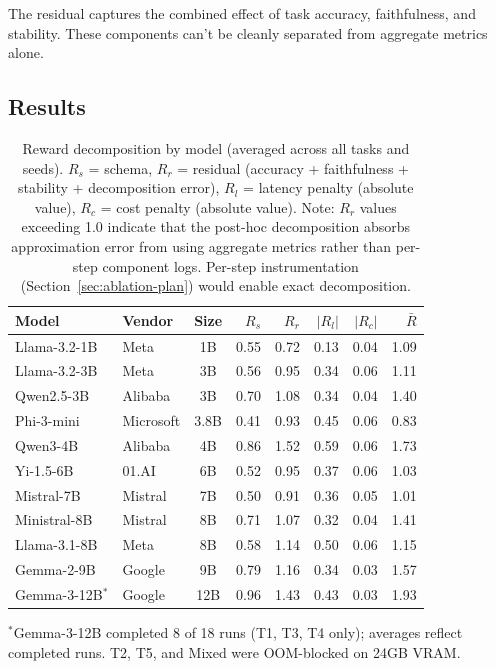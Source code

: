 \documentclass[11pt]{article}
\begin{document}
The residual captures the combined effect of task accuracy, faithfulness, and stability.  These components can't be cleanly separated from aggregate metrics alone.

\subsection{Results}

\begin{table}[t]
\centering
\caption{Reward decomposition by model (averaged across all tasks and seeds). $R_s$ = schema, $R_r$ = residual (accuracy + faithfulness + stability + decomposition error), $R_l$ = latency penalty (absolute value), $R_c$ = cost penalty (absolute value).  Note: $R_r$ values exceeding 1.0 indicate that the post-hoc decomposition absorbs approximation error from using aggregate metrics rather than per-step component logs.  Per-step instrumentation (Section~\ref{sec:ablation-plan}) would enable exact decomposition.}
\label{tab:reward-decomp}
\small
\begin{tabular}{llc rrrr r}
\toprule
\textbf{Model} & \textbf{Vendor} & \textbf{Size} & $R_s$ & $R_r$ & $|R_l|$ & $|R_c|$ & $\bar{R}$ \\
\midrule
Llama-3.2-1B    & Meta      & 1B   & 0.55 & 0.72 & 0.13 & 0.04 & 1.09 \\
Llama-3.2-3B    & Meta      & 3B   & 0.56 & 0.95 & 0.34 & 0.06 & 1.11 \\
Qwen2.5-3B      & Alibaba   & 3B   & 0.70 & 1.08 & 0.34 & 0.04 & 1.40 \\
Phi-3-mini       & Microsoft & 3.8B & 0.41 & 0.93 & 0.45 & 0.06 & 0.83 \\
Qwen3-4B         & Alibaba   & 4B   & 0.86 & 1.52 & 0.59 & 0.06 & 1.73 \\
Yi-1.5-6B        & 01.AI     & 6B   & 0.52 & 0.95 & 0.37 & 0.06 & 1.03 \\
Mistral-7B       & Mistral   & 7B   & 0.50 & 0.91 & 0.36 & 0.05 & 1.01 \\
Ministral-8B     & Mistral   & 8B   & 0.71 & 1.07 & 0.32 & 0.04 & 1.41 \\
Llama-3.1-8B     & Meta      & 8B   & 0.58 & 1.14 & 0.50 & 0.06 & 1.15 \\
Gemma-2-9B       & Google    & 9B   & 0.79 & 1.16 & 0.34 & 0.03 & 1.57 \\
Gemma-3-12B$^*$  & Google    & 12B  & 0.96 & 1.43 & 0.43 & 0.03 & 1.93 \\
\bottomrule
\end{tabular}

\vspace{0.3em}
\footnotesize{$^*$Gemma-3-12B completed 8 of 18 runs (T1, T3, T4 only); averages reflect completed runs.  T2, T5, and Mixed were OOM-blocked on 24GB VRAM.}
\end{table}
\end{document}
